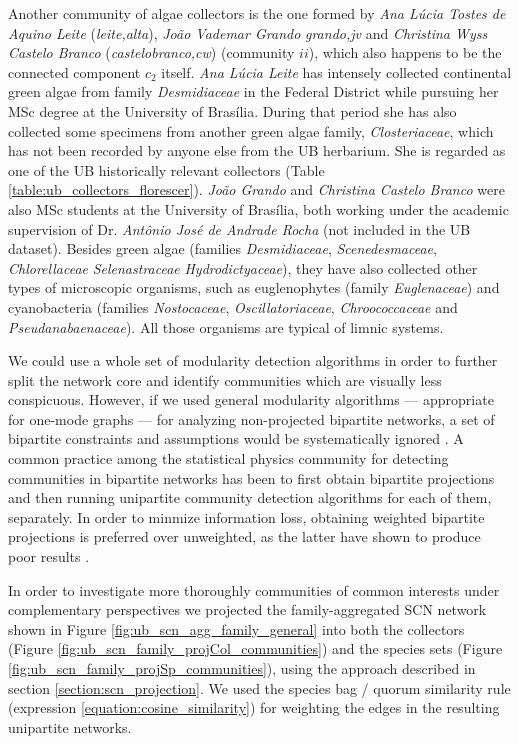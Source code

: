 Another community of algae collectors is the one formed by \textit{Ana Lúcia Tostes de Aquino Leite} (\textit{leite,alta}), \textit{João Vademar Grando} \textit{grando,jv} and \textit{Christina Wyss Castelo Branco} (\textit{castelobranco,cw}) (community $ii$), which also happens to be the connected component $c_2$ itself.
\textit{Ana Lúcia Leite} has intensely collected continental green algae from family \textit{Desmidiaceae} in the Federal District while pursuing her MSc degree at the University of Brasília.
During that period she has also collected some specimens from another green algae family, \textit{Closteriaceae}, which has not been recorded by anyone else from the UB herbarium.
She is regarded as one of the UB historically relevant collectors (Table \ref{table:ub_collectors_florescer}).
%
\textit{João Grando} and \textit{Christina Castelo Branco} were also MSc students at the University of Brasília, both working under the academic supervision of Dr. \textit{Antônio José de Andrade Rocha} (not included in the UB dataset).
Besides green algae (families \textit{Desmidiaceae}, \textit{Scenedesmaceae}, \textit{Chlorellaceae} \textit{Selenastraceae} \textit{Hydrodictyaceae}), they have also collected other types of microscopic organisms, such as euglenophytes (family \textit{Euglenaceae}) and cyanobacteria (families \textit{Nostocaceae}, \textit{Oscillatoriaceae}, \textit{Chroococcaceae} and \textit{Pseudanabaenaceae}). 
All those organisms are typical of limnic systems.
 

We could use a whole set of modularity detection algorithms in order to further split the network core and identify communities which are visually less conspicuous. 
However, if we used general modularity algorithms --- appropriate for one-mode graphs --- for analyzing non-projected bipartite networks, a set of bipartite constraints and assumptions would be systematically ignored \cite{Borgatti2015}.
A common practice among the statistical physics community for detecting communities in bipartite networks has been to first obtain bipartite projections and then running unipartite community detection algorithms for each of them, separately.
In order to minmize information loss, obtaining weighted bipartite projections is preferred over unweighted, as the latter have shown to produce poor results \cite{Guimera2007}.

In order to investigate more thoroughly communities of common interests under complementary perspectives we projected the family-aggregated SCN network shown in Figure \ref{fig:ub_scn_agg_family_general} into both the collectors (Figure \ref{fig:ub_scn_family_projCol_communities}) and the species sets (Figure \ref{fig:ub_scn_family_projSp_communities}), using the approach described in section \ref{section:scn_projection}.
We used the species bag / quorum similarity rule (expression \ref{equation:cosine_similarity}) for weighting the edges in the resulting unipartite networks.


